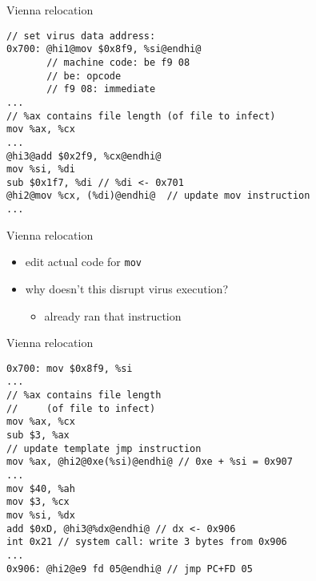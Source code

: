 
\begin{frame}[fragile,label=virusReloc2]{Vienna relocation}
\begin{lstlisting}
// set virus data address:
0x700: @hi1@mov $0x8f9, %si@endhi@
       // machine code: be f9 08
       // be: opcode
       // f9 08: immediate
...
// %ax contains file length (of file to infect)
mov %ax, %cx
...
@hi3@add $0x2f9, %cx@endhi@
mov %si, %di   
sub $0x1f7, %di // %di <- 0x701
@hi2@mov %cx, (%di)@endhi@  // update mov instruction
...
\end{lstlisting}
\end{frame}

\begin{frame}[fragile,label=virusReloc3]{Vienna relocation}
\begin{itemize}
\item edit actual code for {\tt mov}
\item why doesn't this disrupt virus execution?
    \begin{itemize}\item<2> already ran that instruction\end{itemize}
\end{itemize}
\end{frame}

\begin{frame}[fragile,label=virusReloc4]{Vienna relocation}
\begin{lstlisting}
0x700: mov $0x8f9, %si
...
// %ax contains file length
//     (of file to infect)
mov %ax, %cx
sub $3, %ax
// update template jmp instruction
mov %ax, @hi2@0xe(%si)@endhi@ // 0xe + %si = 0x907
...
mov $40, %ah
mov $3, %cx
mov %si, %dx  
add $0xD, @hi3@%dx@endhi@ // dx <- 0x906
int 0x21 // system call: write 3 bytes from 0x906
...
0x906: @hi2@e9 fd 05@endhi@ // jmp PC+FD 05
\end{lstlisting}
\end{frame}

